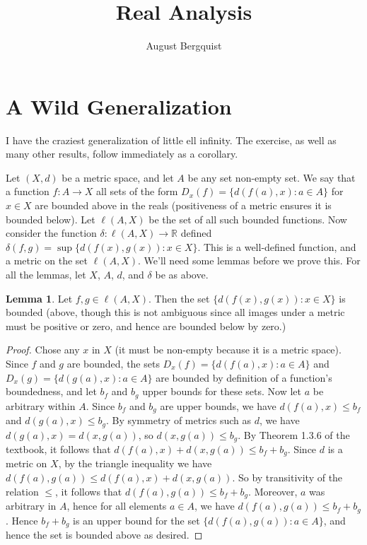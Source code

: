 \documentclass[11pt]{article}
\title{Real Analysis}
\author{August Bergquist}
\newcommand{\R}{\mathbb{R}}
\theoremstyle{definition}
\newtheorem{lemma}{Lemma}
\begin{document}
\maketitle

\section{A Wild Generalization}

I have the craziest generalization of little ell infinity. The exercise, as well as many other results, follow immediately as a corollary.

Let $(X,d)$ be a metric space, and let $A$ be any set non-empty set. We say that a function $f:A\to X$ all sets of the form $D_x(f) = \{d(f(a),x): a \in A\}$ for $x\in X$ are bounded above in the reals (positiveness of a metric ensures it is bounded below). Let $\ell(A,X)$ be the set of all such bounded functions. Now consider the function $\delta:\ell(A,X) \to \R $ defined $\delta(f,g) = \sup\{d(f(x), g(x)): x\in X\}$. This is a well-defined function, and a metric on the set $\ell(A,X)$. We'll need some lemmas before we prove this. For all the lemmas, let $X$, $A$, $d$, and $\delta$ be as above. 

\begin{lemma}
Let $f,g\in \ell(A,X)$. Then the set $\{d(f(x), g(x)): x\in X\}$ is bounded (above, though this is not ambiguous since all images under a metric must be positive or zero, and hence are bounded below by zero.)
\end{lemma}

\begin{proof}

Chose any $x$ in $X$ (it must be non-empty because it is a metric space). Since $f$ and $g$ are bounded, the sets $D_x(f) = \{d(f(a), x): a\in A\}$ and $D_x(g) = \{d(g(a), x): a\in A\}$ are bounded by definition of a function's boundedness, and let $b_f$ and $b_g$ upper bounds for these sets. Now let $a$ be arbitrary within $A$. Since $b_f$ and $b_g$ are upper bounds, we have $d(f(a), x) \le b_f $ and $d(g(a), x) \le b_g$. By symmetry of metrics such as $d$, we have $d(g(a), x) = d(x,g(a))$, so $d(x,g(a))\le b_g$. By Theorem 1.3.6 of the textbook, it follows that $d(f(a), x) + d(x,g(a)) \le b_f + b_g$. Since $d$ is a metric on $X$, by the triangle inequality we have $ d(f(a), g(a)) \le d(f(a), x) + d(x,g(a))$. So by transitivity of the relation $\le$, it follows that $d(f(a), g(a))\le b_f + b_g$. Moreover, $a$ was arbitrary in $A$, hence for all elements $a\in A$, we have $d(f(a), g(a))\le b_f + b_g$. Hence $ b_f + b_g$ is an upper bound for the set $\{d(f(a),g(a)): a\in A\}$, and hence the set is bounded above as desired.
\end{proof}
\end{document}
